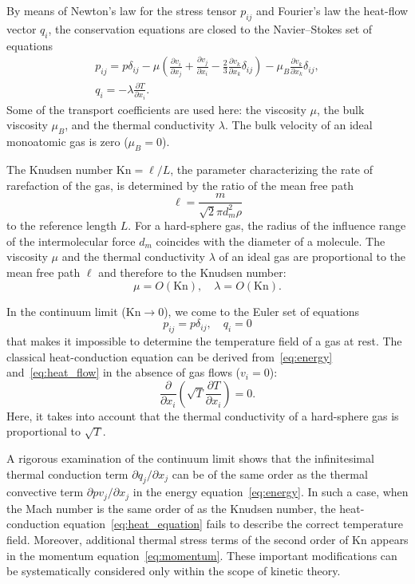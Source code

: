 \documentclass[smallextended, referee]{svjour3} %
\newcommand{\Kn}{\mathrm{Kn}}
\newcommand{\pder}[2][]{\frac{\partial#1}{\partial#2}}
\newcommand{\Pder}[2][]{\partial#1/\partial#2}
\begin{document}
By means of Newton's law for the stress tensor \(p_{ij}\) and Fourier's law the heat-flow vector \(q_i\),
the conservation equations are closed to the Navier--Stokes set of equations
\begin{gather}
	p_{ij} = p\delta_{ij} - \mu\left(\pder[v_i]{x_j}+\pder[v_j]{x_i}-\frac23\pder[v_k]{x_k}\delta_{ij}\right) -
		\mu_B\pder[v_k]{x_k}\delta_{ij}, \label{eq:stress_tensor}\\
	q_i = -\lambda\pder[T]{x_i}. \label{eq:heat_flow}
\end{gather}
Some of the transport coefficients are used here:
the viscosity \(\mu\), the bulk viscosity \(\mu_B\), and the thermal conductivity \(\lambda\).
The bulk velocity of an ideal monoatomic gas is zero (\(\mu_B = 0\)).

The Knudsen number \(\Kn = \ell/L\), the parameter characterizing the rate of rarefaction of the gas,
is determined by the ratio of the mean free path \[ \ell = \frac{m}{\sqrt2\pi d_m^2 \rho} \]
to the reference length \(L\).
For a hard-sphere gas, the radius of the influence range of the intermolecular force \(d_m\)
coincides with the diameter of a molecule.
The viscosity \(\mu\) and the thermal conductivity \(\lambda\) of an ideal gas
are proportional to the mean free path \(\ell\) and therefore to the Knudsen number:
\begin{equation}
	\mu = O(\Kn), \quad \lambda = O(\Kn).
\end{equation}

In the continuum limit (\(\Kn\to0\)), we come to the Euler set of equations
\begin{equation}
	p_{ij} = p\delta_{ij}, \quad q_i = 0
\end{equation}
that makes it impossible to determine the temperature field of a gas at rest.
The classical heat-conduction equation
can be derived from~\eqref{eq:energy} and~\eqref{eq:heat_flow}
in the absence of gas flows (\(v_i = 0\)):
\begin{equation}\label{eq:heat_equation}
	\pder{x_i}\left(\sqrt{T}\pder[T]{x_i}\right) = 0.
\end{equation}
Here, it takes into account that the thermal conductivity of a hard-sphere gas
is proportional to \(\sqrt{T}\).

A rigorous examination of the continuum limit shows that the infinitesimal thermal conduction term \(\Pder[q_j]{x_j}\)
can be of the same order as the thermal convective term \(\Pder[pv_j]{x_j}\) in the energy equation~\eqref{eq:energy}.
In such a case, when the Mach number is the same order of as the Knudsen number,
the heat-conduction equation~\eqref{eq:heat_equation} fails to describe
the correct temperature field. Moreover, additional thermal stress terms of the second order of \(\Kn\)
appears in the momentum equation~\eqref{eq:momentum}.
These important modifications can be systematically considered only within the scope of kinetic theory.
\end{document}
